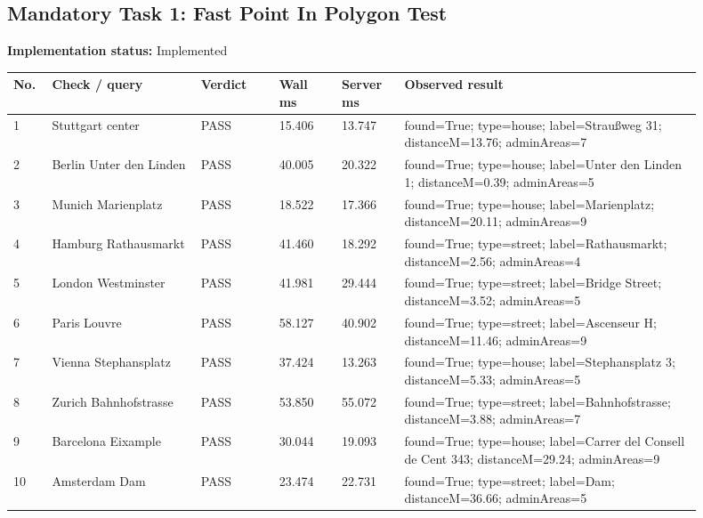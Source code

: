 \documentclass[10pt,a4paper]{article}
\begin{document}
\subsection{Mandatory Task 1: Fast Point In Polygon Test}
\textbf{Implementation status:} Implemented\\
\scriptsize
\begin{longtable}{|P{0.045\linewidth}|P{0.19\linewidth}|P{0.105\linewidth}|P{0.085\linewidth}|P{0.085\linewidth}|P{0.385\linewidth}|}
\hline
\textbf{No.} & \textbf{Check / query} & \textbf{Verdict} & \textbf{Wall ms} & \textbf{Server ms} & \textbf{Observed result}\\ \hline
{} 1 & Stuttgart center & PASS & 15.406 & 13.747 & found=True; type=house; label=Straußweg 31; distanceM=13.76; adminAreas=7\\ \hline
{} 2 & Berlin Unter den Linden & PASS & 40.005 & 20.322 & found=True; type=house; label=Unter den Linden 1; distanceM=0.39; adminAreas=5\\ \hline
{} 3 & Munich Marienplatz & PASS & 18.522 & 17.366 & found=True; type=house; label=Marienplatz; distanceM=20.11; adminAreas=9\\ \hline
{} 4 & Hamburg Rathausmarkt & PASS & 41.460 & 18.292 & found=True; type=street; label=Rathausmarkt; distanceM=2.56; adminAreas=4\\ \hline
{} 5 & London Westminster & PASS & 41.981 & 29.444 & found=True; type=street; label=Bridge Street; distanceM=3.52; adminAreas=5\\ \hline
{} 6 & Paris Louvre & PASS & 58.127 & 40.902 & found=True; type=street; label=Ascenseur H; distanceM=11.46; adminAreas=9\\ \hline
{} 7 & Vienna Stephansplatz & PASS & 37.424 & 13.263 & found=True; type=house; label=Stephansplatz 3; distanceM=5.33; adminAreas=5\\ \hline
{} 8 & Zurich Bahnhofstrasse & PASS & 53.850 & 55.072 & found=True; type=street; label=Bahnhofstrasse; distanceM=3.88; adminAreas=7\\ \hline
{} 9 & Barcelona Eixample & PASS & 30.044 & 19.093 & found=True; type=house; label=Carrer del Consell de Cent 343; distanceM=29.24; adminAreas=9\\ \hline
{} 10 & Amsterdam Dam & PASS & 23.474 & 22.731 & found=True; type=street; label=Dam; distanceM=36.66; adminAreas=5\\ \hline
\end{longtable}
\normalsize
\end{document}
